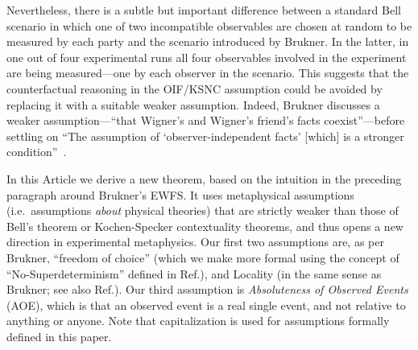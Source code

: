 \documentclass[aps,prx,twocolumn,superscriptaddress]{revtex4-1}
\theoremstyle{plain}
\begin{document}
Nevertheless, there is a subtle but important difference between a standard Bell scenario in which one of two incompatible observables are chosen at random to be measured by each party and the scenario introduced by Brukner. In the latter, in one out of four experimental runs all four observables involved in the experiment are being measured---one by each observer in the scenario. This suggests that the counterfactual reasoning in the {OIF/KSNC} assumption could be avoided by replacing it with a suitable weaker assumption. Indeed, Brukner discusses a weaker 
assumption---``that Wigner’s and Wigner’s friend's facts coexist''---before settling on  ``The assumption of `observer-independent facts' [which] is a stronger condition''~\cite{BruknerLF}.

In this Article we derive a new theorem, based on the intuition in the preceding paragraph around Brukner's EWFS. It uses metaphysical assumptions (i.e.~assumptions \emph{about} physical theories) that are strictly weaker than those of Bell's theorem or Kochen-Specker contextuality theorems, and thus opens a new direction in experimental metaphysics. Our first two assumptions are, as per Brukner, ``{freedom of choice}'' (which we make more formal using the concept of ``{No-Superdeterminism}'' defined in Ref.\cite{Causarum}), and {Locality} (in the same sense as Brukner; see also Ref.\cite{Causarum}). Our third assumption is {\em {Absoluteness of Observed Events}} (AOE), which is that an observed event is a real single event, and not relative to anything or anyone. Note that capitalization is used for assumptions formally defined in this paper.
\end{document}
